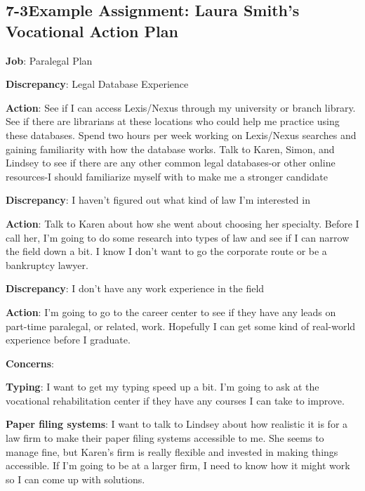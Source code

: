 \pagebreak \subsection*{7-3\quad Example Assignment: Laura Smith's Vocational Action Plan}
\textbf{Job}: Paralegal Plan

\textbf{Discrepancy}: Legal Database Experience

\textbf{Action}: See if I can access Lexis/Nexus through my university or branch library. See if there are librarians at these locations who could help me practice using these databases. Spend two hours per week working on Lexis/Nexus searches and gaining familiarity with how the database works. Talk to Karen, Simon, and Lindsey to see if there are any other common legal databases-or other online resources-I should familiarize myself with to make me a stronger candidate

\textbf{Discrepancy}: I haven't figured out what kind of law I'm interested in

\textbf{Action}: Talk to Karen about how she went about choosing her specialty. Before I call her, I'm going to do some research into types of law and see if I can narrow the field down a bit. I know I don't want to go the corporate route or be a bankruptcy lawyer.

\textbf{Discrepancy}: I don't have any work experience in the field

\textbf{Action}: I'm going to go to the career center to see if they have any leads on part-time paralegal, or related, work. Hopefully I can get some kind of real-world experience before I graduate.
 
\textbf{Concerns}:

\textbf{Typing}: I want to get my typing speed up a bit. I'm going to ask at the vocational rehabilitation center if they have any courses I can take to improve.

\textbf{Paper filing systems}: I want to talk to Lindsey about how realistic it is for a law firm to make their paper filing systems accessible to me. She seems to manage fine, but Karen's firm is really flexible and invested in making things accessible. If I'm going to be at a larger firm, I need to know how it might work so I can come up with solutions.

